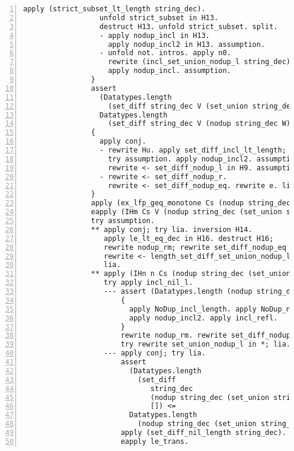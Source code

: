 \begin{lstlisting}[language=Coq, label={lst:thm_32_full_proof}, caption={Full proof of Theorem 3.2 in Coq}, numbers=left]
                  apply (strict_subset_lt_length string_dec).
                  unfold strict_subset in H13.
                  destruct H13. unfold strict_subset. split.
                  - apply nodup_incl in H13.
                    apply nodup_incl2 in H13. assumption.
                  - unfold not. intros. apply n0.
                    rewrite (incl_set_union_nodup_l string_dec).
                    apply nodup_incl. assumption.
                }
                assert
                  (Datatypes.length
                    (set_diff string_dec V (set_union string_dec (nodup string_dec W) U)) <
                  Datatypes.length
                    (set_diff string_dec V (nodup string_dec W)) <= S m).
                {
                  apply conj.
                  - rewrite Hu. apply set_diff_incl_lt_length;
                    try assumption. apply nodup_incl2. assumption.
                    rewrite <- set_diff_nodup_l in H9. assumption.
                  - rewrite <- set_diff_nodup_r.
                    rewrite <- set_diff_nodup_eq. rewrite e. lia.
                }
                apply (ex_lfp_geq_monotone Cs (nodup string_dec V) h' f).
                eapply (IHm Cs V (nodup string_dec (set_union string_dec W U)) h');
                try assumption.
                ** apply conj; try lia. inversion H14.
                   apply le_lt_eq_dec in H16. destruct H16;
                   rewrite nodup_rm; rewrite set_diff_nodup_eq in *;
                   rewrite <- length_set_diff_set_union_nodup_l;
                   lia.
                ** apply (IHn n Cs (nodup string_dec (set_union string_dec W U)) [] h');
                   try apply incl_nil_l.
                   --- assert (Datatypes.length (nodup string_dec V) <= Datatypes.length V).
                       {
                         apply NoDup_incl_length. apply NoDup_nodup.
                         apply nodup_incl2. apply incl_refl.
                       }
                       rewrite nodup_rm. rewrite set_diff_nodup_eq in *;
                       try rewrite set_union_nodup_l in *; lia.
                   --- apply conj; try lia.
                       assert
                         (Datatypes.length
                           (set_diff
                              string_dec
                              (nodup string_dec (set_union string_dec W U))
                              []) <=
                         Datatypes.length
                           (nodup string_dec (set_union string_dec W U))).
                       apply (set_diff_nil_length string_dec).
                       eapply le_trans.

\end{lstlisting}
